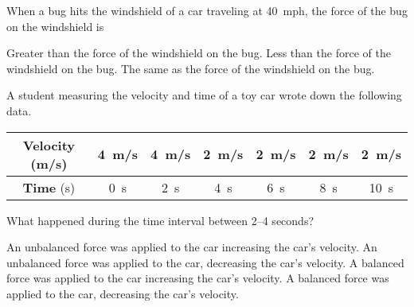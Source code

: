 \documentclass[answers]{exam}
\begin{document}
\begin{questions}


    

\question 
When a bug hits the windshield of a car traveling at \SI{40}{mph}, the force of the bug on the windshield is

\begin{randomizechoices}[norandomize]
    \choice Greater than the force of the windshield on the bug.
    \choice Less than the force of the windshield on the bug.
    \correctchoice The same as the force of the windshield on the bug.
\end{randomizechoices}

\question
A student measuring the velocity and time of a toy car wrote down the following data.

\begin{center}
    \begin{tabular}{|c|c|c|c|c|c|c|}
        \hline
        \textbf{Velocity} (m/s) & \SI{4}{m/s} &  \SI{4}{m/s} & \SI{2}{m/s} & \SI{2}{m/s} & \SI{2}{m/s} & \SI{2}{m/s} \\ \hline
        \textbf{Time} (s) & \SI{0}{s} & \SI{2}{s} & \SI{4}{s} & \SI{6}{s} & \SI{8}{s} & \SI{10}{s} \\
        \hline
    \end{tabular}
\end{center}

What happened during the time interval between 2--4 seconds?

\begin{randomizechoices}[norandomize]
    \choice An unbalanced force was applied to the car increasing the car’s velocity.
    \correctchoice An unbalanced force was applied to the car, decreasing the car’s velocity.
    \choice A balanced force was applied to the car increasing the car’s velocity.
    \choice A balanced force was applied to the car, decreasing the car’s velocity.   
\end{randomizechoices}


\end{questions}
\end{document}
